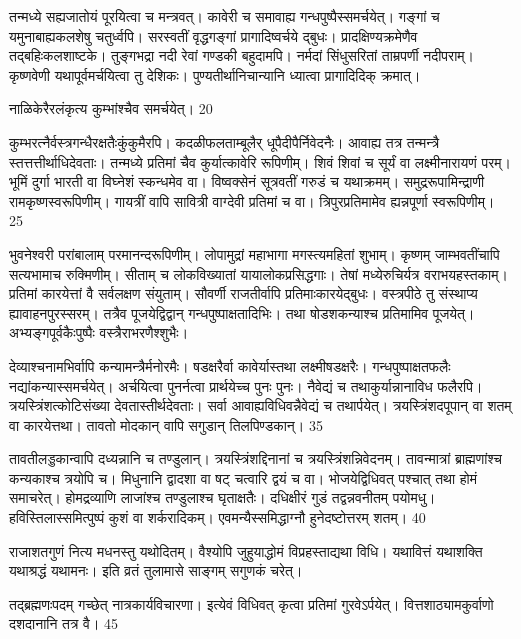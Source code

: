 तन्मध्ये सह्यजातोयं पूरयित्वा च मन्त्रवत्।
कावेरी च समावाह्य गन्धपुष्पैस्समर्चयेत्।
गङ्गां च यमुनाबाह्यकलशेषु चतुर्ध्वपि।
सरस्वतीं वृद्धगङ्गां प्रागादिष्वर्चये द्बुधः।
प्रादक्षिण्यक्रमेणैव तद्बहिःकलशाष्टके।
तुङ्गभद्रा नदी रेवां गण्डकी बहुदामपि।
नर्मदां सिंधुसरितां ताम्रपर्णी नदीपराम्।
कृष्णवेणी यथापूर्वमर्चयित्वा तु देशिकः।
पुण्यतीर्थानिचान्यानि ध्यात्वा प्रागादिदिक् क्रमात्।

नाळिकेरैरलंकृत्य कुम्भांश्चैव समर्चयेत्।
20

कुम्भरत्नैर्वस्त्रगन्धैरक्षतैःकुंकुमैरपि।
कदळीफलताम्बूलैर् धूपैदीपैर्निवेदनैः।
आवाह्य तत्र तन्मन्त्रै स्तत्तत्तीर्थाधिदेवताः।
तन्मध्ये प्रतिमां चैव कुर्यात्कावेरि रूपिणीम्।
शिवं शिवां च सूर्यं वा लक्ष्मीनारायणं परम्।
भूमिं दुर्गा भारती वा विघ्नेशं स्कन्धमेव वा।
विष्वक्सेनं सूत्रवतीं गरुडं च यथाक्रमम्।
समुद्ररूपामिन्द्राणी रामकृष्णस्वरूपिणीम्।
गायत्रीं वापि सावित्री वाग्देवी प्रतिमां च वा।
त्रिपुरप्रतिमामेव ह्यन्नपूर्णा स्वरूपिणीम्।
25

भुवनेश्वरी परांबालाम् परमानन्दरूपिणीम्।
लोपामुद्रां महाभागा मगस्त्यमहितां शुभाम्।
कृष्णम् जाम्भवतींचापि सत्यभामाच रुक्मिणीम्।
सीताम् च लोकविख्यातां यायालोकप्रसिद्धगाः।
तेषां मध्येरुचिर्यत्र वराभयहस्तकाम्।
प्रतिमां कारयेत्तां वै सर्वलक्षण संयुताम्।
सौवर्णी राजतीर्वापि प्रतिमाःकारयेद्बुधः।
वस्त्रपीठे तु संस्थाप्य ह्यावाहनपुरस्सरम्।
तत्रैव पूजयेद्विद्वान् गन्धपुष्पाक्षतादिभिः।
तथा षोडशकन्याश्च प्रतिमामिव पूजयेत्।
अभ्यङ्गपूर्वकैःपुष्पैः वस्त्रैराभरणैश्शुभैः।

देव्याश्चनामभिर्वापि कन्यामन्त्रैर्मनोरमैः।
षडक्षरैर्वा कावेर्यास्तथा लक्ष्मीषडक्षरैः।
गन्धपुष्पाक्षतफलैः नद्यांकन्यास्समर्चयेत्।
अर्चयित्वा पुनर्नत्वा प्रार्थयेच्च पुनः पुनः।
नैवेद्यं च तथाकुर्यान्नानाविध फलैरपि।
त्रयस्त्रिंशत्कोटिसंख्या देवतास्तीर्थदेवताः।
सर्वा आवाह्यविधिवन्नैवेद्यं च तथार्पयेत्।
त्रयस्त्रिंशदपूपान् वा शतम् वा कारयेत्तथा।
तावतो मोदकान् वापि सगुडान् तिलपिण्डकान्।
35

तावतीलड्डकान्वापि दध्यन्नानि च तण्डुलान्।
त्रयस्त्रिंशद्दिनानां च त्रयस्त्रिंशन्निवेदनम्।
तावन्मात्रां ब्राह्मणांश्च कन्यकाश्च त्रयोपि च।
मिधुनानि द्वादशा वा षट् चत्वारि द्वयं च वा।
भोजयेद्विधिवत् पश्चात् तथा होमं समाचरेत्।
होमद्रव्याणि लाजांश्च तण्डुलाश्च घृताक्षतैः।
दधिक्षीरं गुडं तद्वन्नवनीतम् पयोमधु।
हविस्तिलास्समित्पुष्पं कुशं वा शर्करादिकम्।
एवमन्यैस्समिद्धाग्नौ हुनेदष्टोत्तरम् शतम्।
40

राजाशतगुणं नित्य मधनस्तु यथोदितम्।
वैश्योपि जुहुयाद्धोमं विप्रहस्ताद्यथा विधि।
यथावित्तं यथाशक्ति यथाश्रद्धं यथामनः।
इति व्रतं तुलामासे साङ्गम् सगुणकं चरेत्।

तद्ब्रह्मणःपदम् गच्छेत् नात्रकार्यविचारणा।
इत्येवं विधिवत् कृत्वा प्रतिमां गुरवेऽर्पयेत्।
वित्तशाठ्यामकुर्वाणो दशदानानि तत्र वै।
45

